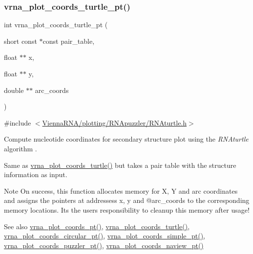 \subsubsection{\texorpdfstring{vrna\_plot\_coords\_turtle\_pt()}{vrna\_plot\_coords\_turtle\_pt()}}
{\footnotesize\ttfamily int vrna\+\_\+plot\+\_\+coords\+\_\+turtle\+\_\+pt (\begin{DoxyParamCaption}\item[{short const $\ast$const}]{pair\+\_\+table,  }\item[{float $\ast$$\ast$}]{x,  }\item[{float $\ast$$\ast$}]{y,  }\item[{double $\ast$$\ast$}]{arc\+\_\+coords }\end{DoxyParamCaption})}



{\ttfamily \#include $<$\mbox{\hyperlink{RNAturtle_8h}{Vienna\+R\+N\+A/plotting/\+R\+N\+Apuzzler/\+R\+N\+Aturtle.\+h}}$>$}



Compute nucleotide coordinates for secondary structure plot using the {\itshape R\+N\+Aturtle} algorithm \cite{wiegreffe:2018}. 

Same as \mbox{\hyperlink{group__plot__layout__utils_ga195139110e2877b92c7f82d05b6dad19}{vrna\+\_\+plot\+\_\+coords\+\_\+turtle()}} but takes a pair table with the structure information as input.

\begin{DoxyNote}{Note}
On success, this function allocates memory for X, Y and arc coordinates and assigns the pointers at addressess {\ttfamily x}, {\ttfamily y} and @arc\+\_\+coords to the corresponding memory locations. It\textquotesingle{}s the users responsibility to cleanup this memory after usage!
\end{DoxyNote}
\begin{DoxySeeAlso}{See also}
\mbox{\hyperlink{group__plot__layout__utils_gaccd6a87cb324b7d680e5dd93e112738b}{vrna\+\_\+plot\+\_\+coords\+\_\+pt()}}, \mbox{\hyperlink{group__plot__layout__utils_ga195139110e2877b92c7f82d05b6dad19}{vrna\+\_\+plot\+\_\+coords\+\_\+turtle()}}, \mbox{\hyperlink{group__plot__layout__utils_gaeec80faa235f3ca489bc5e50adc41460}{vrna\+\_\+plot\+\_\+coords\+\_\+circular\+\_\+pt()}}, \mbox{\hyperlink{group__plot__layout__utils_ga76788091848e73cfb24b31536e22b7dd}{vrna\+\_\+plot\+\_\+coords\+\_\+simple\+\_\+pt()}}, \mbox{\hyperlink{group__plot__layout__utils_gab50a90dd6000a1920d741537af7e0b24}{vrna\+\_\+plot\+\_\+coords\+\_\+puzzler\+\_\+pt()}}, \mbox{\hyperlink{group__plot__layout__utils_gaa5089debe89c11e301dea04b3236efe3}{vrna\+\_\+plot\+\_\+coords\+\_\+naview\+\_\+pt()}}
\end{DoxySeeAlso}

